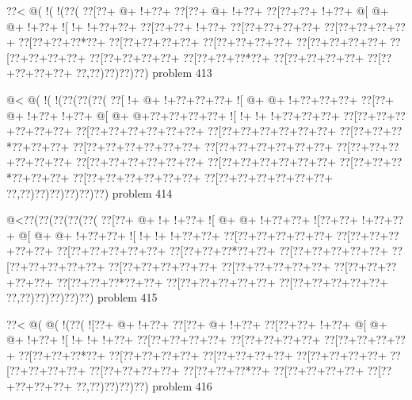 \vbox{\vbox{\goo
\0??<\- @(\- !(\- !(\0??(
\0??[\0??+\- @+\- !+\0??+
\0??[\0??+\- @+\- !+\0??+
\0??[\0??+\0??+\- !+\0??+
\- @[\- @+\- @+\- !+\0??+
\- ![\- !+\- !+\0??+\0??+
\0??[\0??+\0??+\- !+\0??+
\0??[\0??+\0??+\0??+\0??+
\0??[\0??+\0??+\0??+\0??+
\0??[\0??+\0??+\0??*\0??+
\0??[\0??+\0??+\0??+\0??+
\0??[\0??+\0??+\0??+\0??+
\0??[\0??+\0??+\0??+\0??+
\0??[\0??+\0??+\0??+\0??+
\0??[\0??+\0??+\0??+\0??+
\0??[\0??+\0??+\0??*\0??+
\0??[\0??+\0??+\0??+\0??+
\0??[\0??+\0??+\0??+\0??+
\0??,\0??)\0??)\0??)\0??)
}
\hfil problem 413\hfil\break
}

\vbox{\vbox{\goo
\- @<\- @(\- !(\- !(\0??(\0??(\0??(
\0??[\- !+\- @+\- !+\0??+\0??+\0??+
\- ![\- @+\- @+\- !+\0??+\0??+\0??+
\0??[\0??+\- @+\- !+\0??+\- !+\0??+
\- @[\- @+\- @+\0??+\0??+\0??+\0??+
\- ![\- !+\- !+\- !+\0??+\0??+\0??+
\0??[\0??+\0??+\0??+\0??+\0??+\0??+
\0??[\0??+\0??+\0??+\0??+\0??+\0??+
\0??[\0??+\0??+\0??+\0??+\0??+\0??+
\0??[\0??+\0??+\0??*\0??+\0??+\0??+
\0??[\0??+\0??+\0??+\0??+\0??+\0??+
\0??[\0??+\0??+\0??+\0??+\0??+\0??+
\0??[\0??+\0??+\0??+\0??+\0??+\0??+
\0??[\0??+\0??+\0??+\0??+\0??+\0??+
\0??[\0??+\0??+\0??+\0??+\0??+\0??+
\0??[\0??+\0??+\0??*\0??+\0??+\0??+
\0??[\0??+\0??+\0??+\0??+\0??+\0??+
\0??[\0??+\0??+\0??+\0??+\0??+\0??+
\0??,\0??)\0??)\0??)\0??)\0??)\0??)
}
\hfil problem 414\hfil\break
}

\vbox{\vbox{\goo
\- @<\0??(\0??(\0??(\0??(\0??(
\0??[\0??+\- @+\- !+\- !+\0??+
\- ![\- @+\- @+\- !+\0??+\0??+
\- ![\0??+\0??+\- !+\0??+\0??+
\- @[\- @+\- @+\- !+\0??+\0??+
\- ![\- !+\- !+\- !+\0??+\0??+
\0??[\0??+\0??+\0??+\0??+\0??+
\0??[\0??+\0??+\0??+\0??+\0??+
\0??[\0??+\0??+\0??+\0??+\0??+
\0??[\0??+\0??+\0??*\0??+\0??+
\0??[\0??+\0??+\0??+\0??+\0??+
\0??[\0??+\0??+\0??+\0??+\0??+
\0??[\0??+\0??+\0??+\0??+\0??+
\0??[\0??+\0??+\0??+\0??+\0??+
\0??[\0??+\0??+\0??+\0??+\0??+
\0??[\0??+\0??+\0??*\0??+\0??+
\0??[\0??+\0??+\0??+\0??+\0??+
\0??[\0??+\0??+\0??+\0??+\0??+
\0??,\0??)\0??)\0??)\0??)\0??)
}
\hfil problem 415\hfil\break
}

\vbox{\vbox{\goo
\0??<\- @(\- @(\- !(\0??(
\- ![\0??+\- @+\- !+\0??+
\0??[\0??+\- @+\- !+\0??+
\0??[\0??+\0??+\- !+\0??+
\- @[\- @+\- @+\- !+\0??+
\- ![\- !+\- !+\- !+\0??+
\0??[\0??+\0??+\0??+\0??+
\0??[\0??+\0??+\0??+\0??+
\0??[\0??+\0??+\0??+\0??+
\0??[\0??+\0??+\0??*\0??+
\0??[\0??+\0??+\0??+\0??+
\0??[\0??+\0??+\0??+\0??+
\0??[\0??+\0??+\0??+\0??+
\0??[\0??+\0??+\0??+\0??+
\0??[\0??+\0??+\0??+\0??+
\0??[\0??+\0??+\0??*\0??+
\0??[\0??+\0??+\0??+\0??+
\0??[\0??+\0??+\0??+\0??+
\0??,\0??)\0??)\0??)\0??)
}
\hfil problem 416\hfil\break
}

